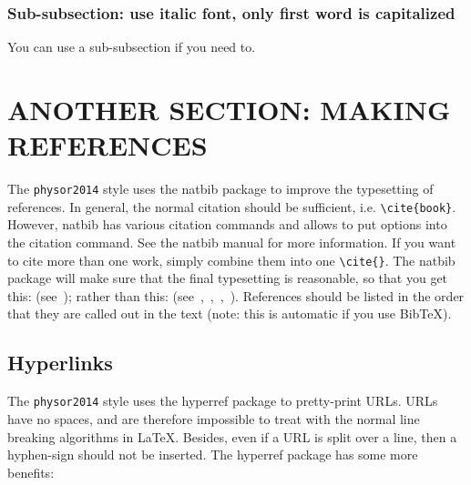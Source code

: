 \documentclass[12pt]{article}
\begin{document}
%
\subsubsection{Sub-subsection: use italic font, only first word is capitalized} 
\label{subsubsect::minor}

You can use a sub-subsection if you need to.

%
\section{ANOTHER SECTION: MAKING REFERENCES} 
\label{sect::references}

The \texttt{physor2014} style uses the natbib package to improve the typesetting of references. In general, the normal citation should be sufficient, i.e. \verb|\cite{book}|. However, natbib has various citation commands and allows to put options into the citation command. See the natbib manual for more information. If you want to cite more than one work, simply combine them into one \verb|\cite{}|. The natbib package will make sure that the final typesetting is reasonable, so that you get this: (see~\cite{proc_paper,website,journal,book}); rather than this: (see~\cite{proc_paper},~\cite{website},~\cite{journal},~\cite{book}). References should be listed in the order that they are called out in the text (note: this is automatic if you use Bib\TeX).

%
\subsection{Hyperlinks} 
\label{subsect::hyper}

The \texttt{physor2014} style uses the hyperref package to pretty-print URLs. URLs have no spaces, and are therefore impossible to treat with the normal line breaking algorithms in \LaTeX. Besides, even if a URL is split over a line, then a hyphen-sign should not be inserted. The hyperref package has some more benefits:
\end{document}
